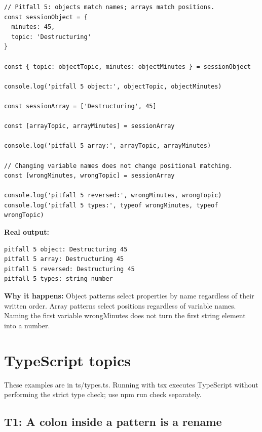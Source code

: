 \documentclass[10pt,a4paper]{article}
\begin{document}
\begin{lstlisting}[language=GuideJS]
// Pitfall 5: objects match names; arrays match positions.
const sessionObject = {
  minutes: 45,
  topic: 'Destructuring'
}

const { topic: objectTopic, minutes: objectMinutes } = sessionObject

console.log('pitfall 5 object:', objectTopic, objectMinutes)

const sessionArray = ['Destructuring', 45]

const [arrayTopic, arrayMinutes] = sessionArray

console.log('pitfall 5 array:', arrayTopic, arrayMinutes)

// Changing variable names does not change positional matching.
const [wrongMinutes, wrongTopic] = sessionArray

console.log('pitfall 5 reversed:', wrongMinutes, wrongTopic)
console.log('pitfall 5 types:', typeof wrongMinutes, typeof wrongTopic)
\end{lstlisting}


\textbf{Real output:}

\begin{lstlisting}[language={}]
pitfall 5 object: Destructuring 45
pitfall 5 array: Destructuring 45
pitfall 5 reversed: Destructuring 45
pitfall 5 types: string number
\end{lstlisting}

\textbf{Why it happens:} Object patterns select properties by name regardless of their written order. Array patterns select positions regardless of variable names. Naming the first variable wrongMinutes does not turn the first string element into a number.

\section{TypeScript topics}

These examples are in ts/types.ts. Running with tsx executes TypeScript without performing the strict type check; use npm run check separately.

\subsection{T1: A colon inside a pattern is a rename}
\end{document}
